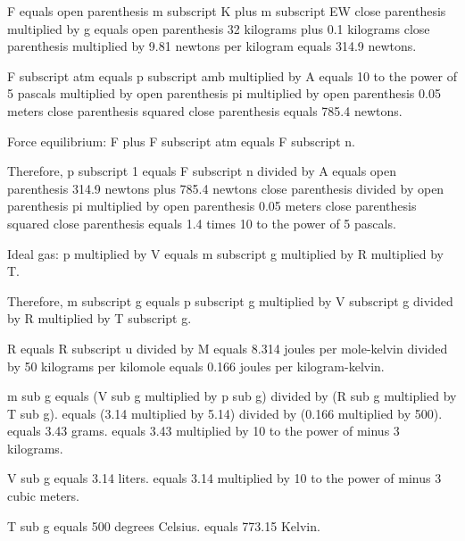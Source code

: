 F equals open parenthesis m subscript K plus m subscript EW close parenthesis multiplied by g equals open parenthesis 32 kilograms plus 0.1 kilograms close parenthesis multiplied by 9.81 newtons per kilogram equals 314.9 newtons.  

F subscript atm equals p subscript amb multiplied by A equals 10 to the power of 5 pascals multiplied by open parenthesis pi multiplied by open parenthesis 0.05 meters close parenthesis squared close parenthesis equals 785.4 newtons.  

Force equilibrium:  
F plus F subscript atm equals F subscript n.  

Therefore, p subscript 1 equals F subscript n divided by A equals open parenthesis 314.9 newtons plus 785.4 newtons close parenthesis divided by open parenthesis pi multiplied by open parenthesis 0.05 meters close parenthesis squared close parenthesis equals 1.4 times 10 to the power of 5 pascals.  

Ideal gas:  
p multiplied by V equals m subscript g multiplied by R multiplied by T.  

Therefore, m subscript g equals p subscript g multiplied by V subscript g divided by R multiplied by T subscript g.  

R equals R subscript u divided by M equals 8.314 joules per mole-kelvin divided by 50 kilograms per kilomole equals 0.166 joules per kilogram-kelvin.

m sub g equals (V sub g multiplied by p sub g) divided by (R sub g multiplied by T sub g).  
equals (3.14 multiplied by 5.14) divided by (0.166 multiplied by 500).  
equals 3.43 grams.  
equals 3.43 multiplied by 10 to the power of minus 3 kilograms.  

V sub g equals 3.14 liters.  
equals 3.14 multiplied by 10 to the power of minus 3 cubic meters.  

T sub g equals 500 degrees Celsius.  
equals 773.15 Kelvin.